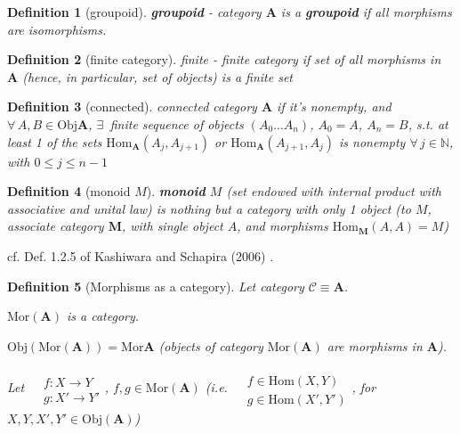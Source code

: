 \documentclass[10pt]{amsart}
\newtheorem{definition}{Definition}
\begin{document}
\begin{multicols*}{2}
\begin{definition}[groupoid]
\textbf{groupoid} - category $\mathbf{A}$ is a \textbf{groupoid} if all morphisms are isomorphisms.
\end{definition}

\begin{definition}[finite category]
	finite - finite category if set of all morphisms in $\mathbf{A}$ (hence, in particular, set of objects) is a finite set
\end{definition}

\begin{definition}[connected]
	connected category $\mathbf{A}$ if it's nonempty, and $\forall \, A,B \in \text{Obj}\mathbf{A}$, $\exists \, $ finite sequence of objects $(A_0 \dots A_n)$, $A_0 = A$, $A_n = B$, s.t. at least 1 of the sets $\text{Hom}_{\mathbf{A}}(A_j, A_{j+1})$ or $\text{Hom}_{\mathbf{A}}(A_{j+1}, A_j)$ is nonempty $\forall \, j \in \mathbb{N}$, with $0\leq j \leq n-1$
\end{definition}

\begin{definition}[monoid $M$]
	\textbf{monoid} $M$ (set endowed with internal product with associative and unital law) is nothing but a category with only 1 object (to $M$, associate category $\mathbf{M}$, with single object $A$, and morphisms $\text{Hom}_{\mathbf{M}}(A,A) = M$)
\end{definition}

cf. Def. 1.2.5 of Kashiwara and Schapira (2006) \cite{KaSch2006}.

\begin{definition}[Morphisms as a category]
	Let category $\mathcal{C} \equiv \mathbf{A}$.
	
	$\text{Mor}(\mathbf{A})$ is a category.
	
	$\text{Obj}(\text{Mor}(\mathbf{A})) = \text{Mor}\mathbf{A}$ (objects of category $\text{Mor}(\mathbf{A})$ are morphisms in $\mathbf{A}$).
	
	Let $\begin{aligned} & \quad \\ 
	& f:X \to Y \\
	& g: X' \to Y'\end{aligned}$, $f,g \in \text{Mor}(\mathbf{A})$ (i.e. $\begin{aligned} & \quad \\ 
	& f \in \text{Hom}(X,Y) \\ 
	&g \in \text{Hom}(X', Y') \end{aligned}$, for $X, Y, X', Y' \in \text{Obj}(\mathbf{A})$)
	

\end{definition}
\end{multicols*}
\end{document}
